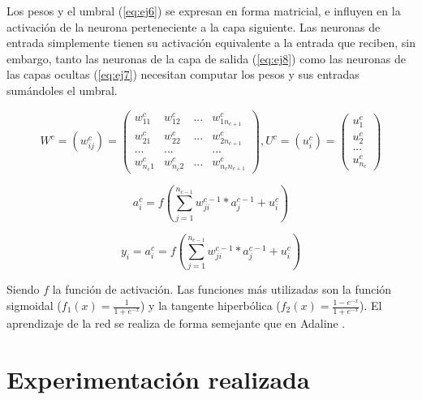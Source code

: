 \documentclass[11pt,spanish,listoffigures,listoftables]{workluis}
\begin{document}
\par Los pesos y el umbral (\ref{eq:ej6}) se expresan en forma matricial, e influyen en la activación de la neurona perteneciente a la capa siguiente. Las neuronas de entrada simplemente tienen su activación equivalente a la entrada que reciben, sin embargo, tanto las neuronas de la capa de salida (\ref{eq:ej8}) como las neuronas de las capas ocultas (\ref{eq:ej7}) necesitan computar los pesos y sus entradas sumándoles el umbral.

\begin{equation}\label{eq:ej6}
W^c = (w_{ij}^c) = \begin{pmatrix}
w_{11}^c & w_{12}^c & ... & w_{1n_{c+1}}^c\\ 
w_{21}^c & w_{22}^c & ... & w_{2n_{c+1}}^c\\ 
... & ... & & ...\\ 
w_{n_{c}1}^c & w_{n_{c}2}^c & ... & w_{n_{c}n_{c+1}}^c 
\end{pmatrix}  ,  U^c = (u_{i}^c) = \begin{pmatrix}
u_{1}^c\\ 
u_{2}^c\\ 
...\\ 
u_{n_{c}}^c 
\end{pmatrix}
\end{equation}

\begin{equation}\label{eq:ej7}
a_{i}^c = f(\sum_{j=1}^{n_{c-1}}w_{ji}^{c-1}*a_{j}^{c-1} + u_{i}^{c})
\end{equation} 

\begin{equation}\label{eq:ej8}
y_{i} = a_{i}^c = f(\sum_{j=1}^{n_{c-1}}w_{ji}^{c-1}*a_{j}^{c-1} + u_{i}^{c})
\end{equation} 

\par Siendo $f$ la función de activación. Las funciones más utilizadas son la función sigmoidal ($f_{1}(x) = \frac{1}{1+e^{-x}}$) y la tangente hiperbólica ($f_{2}(x) = \frac{1-e^{-x}}{1+e^{-x}}$). El aprendizaje de la red se realiza de forma semejante que en Adaline \cite{MLP}.

\section{Experimentación realizada}
\end{document}

